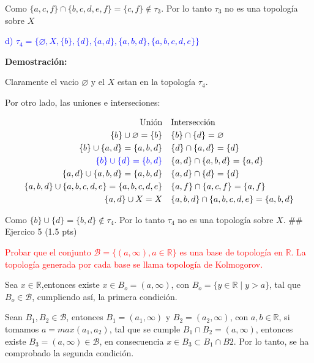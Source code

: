 \documentclass[
]{article}
\begin{document}
Como \(\{a,c,f\} \cap \{b,c,d,e,f\}=\{c,f\} \notin \tau_3\). Por lo
tanto \(\tau_{3}\) no es una topología sobre \(X\)

\textcolor{blue}{d) $\tau_{4} =\{ \varnothing,X,\{b\},\{d\},\{a,d\},\{a,b,d\},\{a,b,c,d,e\}\}$}

\textbf{Demostración:}

Claramente el vacio \(\varnothing\) y el \(X\) estan en la topología
\(\tau_4\).

Por otro lado, las uniones e interseciones:

\begin{align*}
\mbox{Unión}                                  &        &          &\mbox{Intersección} \\
\{b\} \cup \varnothing =\{b\}                 &        &          &\{b\} \cap \{d\}=\varnothing \\
\{b\} \cup \{a,d\}=\{a,b,d\}                  &        &          &\{d\} \cap \{a,d\}=\{d\} \\
\textcolor{blue}{\{b\} \cup \{d\}=\{b,d\}}                      &        &          &\{a,d\} \cap \{a,b,d\}=\{a,d\} \\
\{a,d\} \cup \{a,b,d\}= \{a,b,d\}             &        &          &\{a,d\} \cap \{d\}=\{d\} \\
\{a,b,d\} \cup \{a,b,c,d,e\}=\{a,b,c,d,e\}    &        &          &\{a,f\} \cap \{a,c,f\}=\{a,f\} \\
\{a,d\} \cup X = X                            &        &          &\{a,b,d\} \cap \{a,b,c,d,e\}=\{a,b,d\} 
\end{align*}

Como \(\{b\} \cup \{d\}=\{b,d\} \notin \tau_4\). Por lo tanto
\(\tau_{4}\) no es una topología sobre \(X\). \#\# Ejercico 5 (1.5 pts)

\textcolor{red}{Probar que el conjunto $\mathcal{B}=\{(a,\infty), a \in \mathbb{R}\}$ es una base de topología en $\mathbb{R}$. La topología generada por cada base se llama topología de Kolmogorov.}

Sea \(x \in \mathbb{R}\),entonces existe \(x \in B_o=(a, \infty)\), con
\(B_o=\{ y \in \mathbb{R} \mid y > a\}\), tal que
\(B_o \in \mathcal{B}\), cumpliendo así, la primera condición.

Sean \(B_1,B_2 \in \mathcal{B}\), entonces \(B_1=(a_1, \infty)\) y
\(B_2=(a_2, \infty)\), con \(a,b \in \mathbb{R}\), si tomamos
\(a=max(a_1,a_2)\), tal que se cumple \(B_1 \cap B_2=(a, \infty)\),
entonces existe \(B_3=(a,\infty) \in \mathcal{B}\), en consecuencia
\(x\in B_3 \subset B_1 \cap B2\). Por lo tanto, se ha comprobado la
segunda condición.
\end{document}
